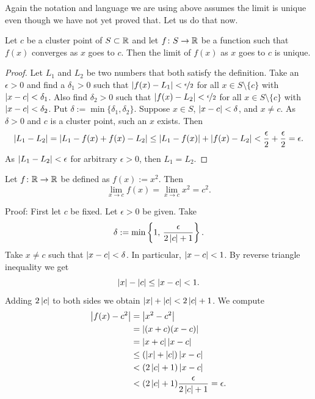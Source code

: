 Again the notation and language we are using above assumes the limit
is unique even though we have not yet proved that.
Let us do that now.

\begin{prop}
Let $c$ be a cluster point of $S \subset {\mathbb{R}}$ and let $f \colon S \to {\mathbb{R}}$
be a function such that $f(x)$ converges as $x$ goes to $c$.  Then
the limit of $f(x)$ as $x$ goes to $c$ is unique.
\end{prop}

\begin{proof}
Let $L_1$ and $L_2$ be two numbers that both satisfy the definition.
Take an $\epsilon > 0$ and find a $\delta_1 > 0$ such that
$\left\lvert {f(x)-L_1} \right\rvert < \nicefrac{\epsilon}{2}$ 
for all $x \in S \setminus \{c\}$ with $\left\lvert {x-c} \right\rvert < \delta_1$.
Also find $\delta_2 > 0$ such that
$\left\lvert {f(x)-L_2} \right\rvert < \nicefrac{\epsilon}{2}$
for all $x \in S \setminus \{c\}$ with $\left\lvert {x-c} \right\rvert < \delta_2$.
Put $\delta := \min \{ \delta_1, \delta_2 \}$.  Suppose $x \in S$,
$\left\lvert {x-c} \right\rvert < \delta$, and $x \not= c$.  As $\delta > 0$ and $c$ is a cluster
point, such an $x$ exists.  Then
\begin{equation*}
\left\lvert {L_1 - L_2} \right\rvert =
\left\lvert {L_1 - f(x) + f(x) - L_2} \right\rvert \leq
\left\lvert {L_1 - f(x)} \right\rvert + \left\lvert {f(x) - L_2} \right\rvert < \frac{\epsilon}{2} + \frac{\epsilon}{2}
= \epsilon.
\end{equation*}
As $\left\lvert {L_1-L_2} \right\rvert < \epsilon$ for arbitrary $\epsilon > 0$, then
$L_1 = L_2$.
\end{proof}

\begin{example}
Let $f \colon {\mathbb{R}} \to {\mathbb{R}}$ be defined as $f(x) := x^2$.  Then
\begin{equation*}
\lim_{x\to c} f(x) = \lim_{x\to c} x^2 = c^2 .
\end{equation*}

Proof: First let $c$ be fixed.  Let $\epsilon > 0$ be given.  Take
\begin{equation*}
\delta := \min \left\{ 1 , \, \frac{\epsilon}{2\left\lvert {c} \right\rvert+1} \right\} .
\end{equation*}
Take $x \not= c$ such that $\left\lvert {x-c} \right\rvert < \delta$.  In particular,
$\left\lvert {x-c} \right\rvert < 1$.  By reverse triangle inequality we get
\begin{equation*}
\left\lvert {x} \right\rvert-\left\lvert {c} \right\rvert \leq \left\lvert {x-c} \right\rvert < 1 .
\end{equation*}
Adding $2\left\lvert {c} \right\rvert$ to both sides we obtain
$\left\lvert {x} \right\rvert + \left\lvert {c} \right\rvert < 2\left\lvert {c} \right\rvert + 1$.  We compute
\begin{equation*}
\begin{split}
\left\lvert {f(x) - c^2} \right\rvert &= \left\lvert {x^2-c^2} \right\rvert \\
&= \left\lvert {(x+c)(x-c)} \right\rvert \\
&= \left\lvert {x+c} \right\rvert\left\lvert {x-c} \right\rvert \\
&\leq (\left\lvert {x} \right\rvert+\left\lvert {c} \right\rvert)\left\lvert {x-c} \right\rvert \\
&< (2\left\lvert {c} \right\rvert+1)\left\lvert {x-c} \right\rvert \\
&< (2\left\lvert {c} \right\rvert+1)\frac{\epsilon}{2\left\lvert {c} \right\rvert+1} = \epsilon .
\end{split}
\end{equation*}
\end{example}

